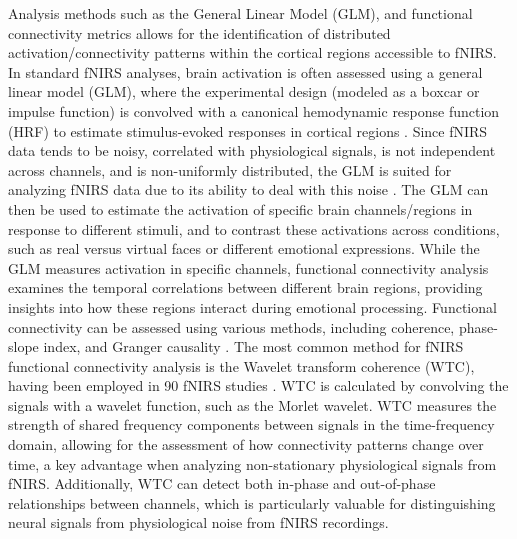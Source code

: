 Analysis methods such as the General Linear Model (GLM), and functional connectivity metrics allows for the identification of distributed activation/connectivity patterns within the cortical regions accessible to fNIRS.
In standard fNIRS analyses, brain activation is often assessed using a general linear model (GLM), where the experimental design (modeled as a boxcar or impulse function) is convolved with a canonical hemodynamic response function (HRF) to estimate stimulus-evoked responses in cortical regions \citep{tak_statistical_2014}.
Since fNIRS data tends to be noisy, correlated with physiological signals, is not independent across channels, and is non-uniformly distributed, the GLM is suited for analyzing fNIRS data due to its ability to deal with this noise \citep{huppert_commentary_2016}. 
The GLM can then be used to estimate the activation of specific brain channels/regions in response to different stimuli, and to contrast these activations across conditions, such as real versus virtual faces or different emotional expressions.
While the GLM measures activation in specific channels, functional connectivity analysis examines the temporal correlations between different brain regions, providing insights into how these regions interact during emotional processing.
Functional connectivity can be assessed using various methods, including coherence, phase-slope index, and Granger causality \citep{bastos_tutorial_2016}.
The most common method for fNIRS functional connectivity analysis is the Wavelet transform coherence (WTC), having been employed in 90 fNIRS studies \citep{hakim_quantification_2023}. 
WTC is calculated by convolving the signals with a wavelet function, such as the Morlet wavelet. 
WTC measures the strength of shared frequency components between signals in the time-frequency domain, allowing for the assessment of how connectivity patterns change over time, a key advantage when analyzing non-stationary physiological signals from fNIRS. 
Additionally, WTC can detect both in-phase and out-of-phase relationships between channels, which is particularly valuable for distinguishing neural signals from physiological noise from fNIRS recordings.

